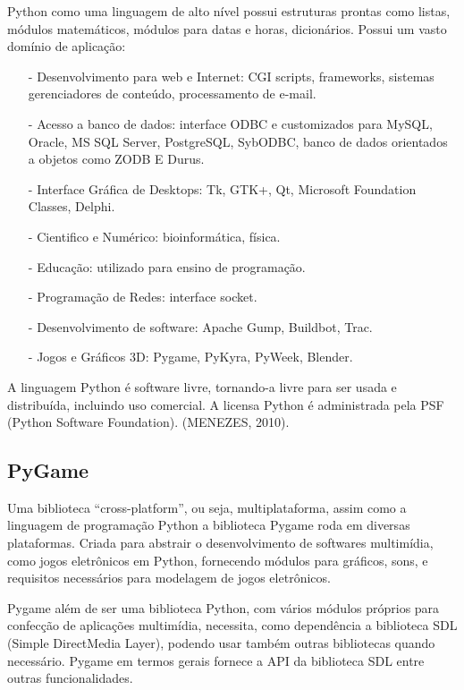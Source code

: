 Python como uma linguagem de alto nível possui estruturas prontas como listas, módulos matemáticos, módulos para datas e horas, dicionários. Possui um vasto domínio de aplicação:

\begin{itemize}
	\item[-] Desenvolvimento para web e Internet: CGI scripts, frameworks, sistemas gerenciadores de conteúdo, processamento de e-mail.
	\item[-] Acesso a banco de dados: interface ODBC e customizados para MySQL, Oracle, MS SQL Server, PostgreSQL, SybODBC, banco de dados orientados a objetos como ZODB E Durus.
	\item[-] Interface Gráfica de Desktops: Tk, GTK+, Qt, Microsoft Foundation Classes, Delphi.
	\item[-] Cientifico e Numérico: bioinformática, física.
	\item[-] Educação: utilizado para ensino de programação.
	\item[-] Programação de Redes: interface socket. 
	\item[-] Desenvolvimento de software: Apache Gump, Buildbot, Trac.
	\item[-] Jogos e Gráficos 3D: Pygame, PyKyra, PyWeek, Blender.	
\end{itemize}
 
A linguagem Python é software livre, tornando-a livre para ser usada e distribuída, incluindo uso comercial. A licensa Python é administrada pela PSF (Python Software Foundation). (MENEZES, 2010).


\subsection{PyGame}

Uma biblioteca “cross-platform”, ou seja, multiplataforma, assim como a linguagem de programação Python a biblioteca Pygame roda em diversas plataformas. Criada para abstrair o desenvolvimento de softwares multimídia, como jogos eletrônicos em Python, fornecendo módulos para gráficos, sons, e requisitos necessários para modelagem de jogos eletrônicos.

Pygame além de ser uma biblioteca Python, com vários módulos próprios para confecção de aplicações multimídia, necessita, como dependência a biblioteca SDL (Simple DirectMedia Layer), podendo usar também outras bibliotecas quando necessário. Pygame em termos gerais fornece a API da biblioteca SDL entre outras funcionalidades.

